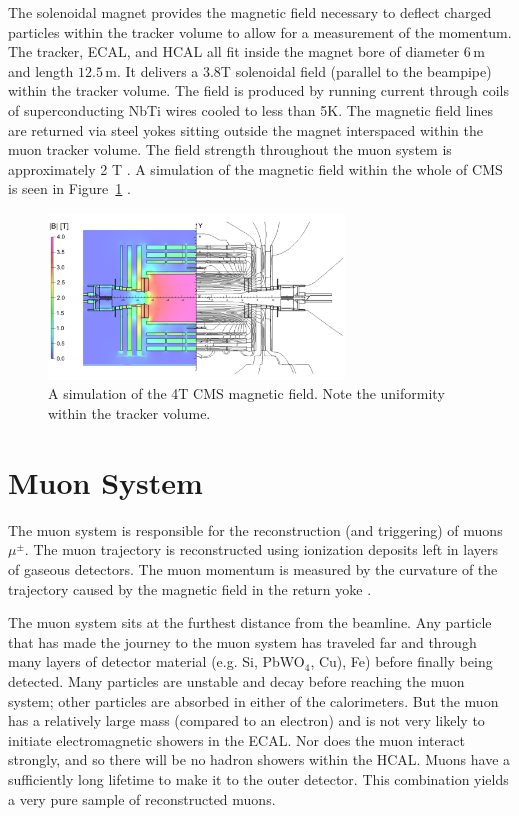 The solenoidal magnet provides the magnetic field necessary to deflect charged particles within the tracker volume to allow for a measurement of the momentum. The tracker, ECAL, and HCAL all fit inside the magnet bore of diameter $6\,\textrm{m}$ and length $12.5\,\textrm{m}$. It delivers a 3.8T solenoidal field (parallel to the beampipe) within the tracker volume. The field is produced by running current through coils of superconducting NbTi wires cooled to less than 5K. The magnetic field lines are returned via steel yokes sitting outside the magnet interspaced within the muon tracker volume. The field strength throughout the muon system is approximately 2 T \cite{magnettdr}. A simulation of the magnetic field within the whole of CMS is seen in Figure~\ref{fig:magnet} \cite{magnet}.

\begin{figure}
\centering
\includegraphics[width=0.7\textwidth]{figs/magnet.png}
\caption[A simulation of the 4T CMS magnetic field.]
{A simulation of the 4T CMS magnetic field. Note the uniformity within the tracker volume.}
\label{fig:magnet}
\end{figure}

\section{Muon System}

The muon system is responsible for the reconstruction (and triggering) of muons $\mu^{\pm}$. The muon trajectory is reconstructed using ionization deposits left in layers of gaseous detectors. The muon momentum is measured by the curvature of the trajectory caused by the magnetic field in the return yoke \cite{muontdr}.

The muon system sits at the furthest distance from the beamline. Any particle that has made the journey to the muon system has traveled far and through many layers of detector material (e.g. Si, PbWO$_{4}$, Cu), Fe) before finally being detected. Many particles are unstable and decay before reaching the muon system; other particles are absorbed in either of the calorimeters. But the muon has a relatively large mass (compared to an electron) and is not very likely to initiate electromagnetic showers in the ECAL. Nor does the muon interact strongly, and so there will be no hadron showers within the HCAL. Muons have a sufficiently long lifetime to make it to the outer detector. This combination yields a very pure sample of reconstructed muons.

